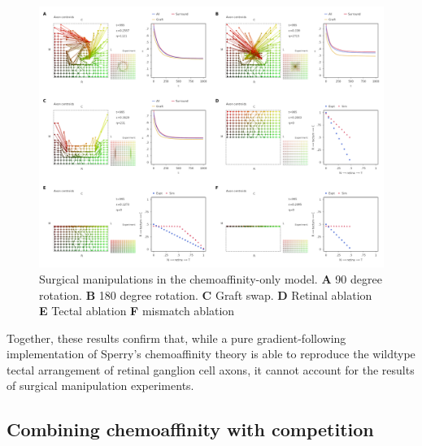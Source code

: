 \documentclass[11pt, a4paper]{article}
\begin{document}
%
%
\begin{figure}
\includegraphics[width=0.95\linewidth]{./images/fig_chemo_manipulations.png}
\caption{Surgical manipulations in the chemoaffinity-only model. \textbf{A} 90 degree
rotation. \textbf{B} 180 degree rotation. \textbf{C} Graft swap. \textbf{D}
Retinal ablation \textbf{E} Tectal ablation \textbf{F} mismatch ablation}
\label{f:chsurg}
\end{figure}

Together, these results confirm that, while a pure gradient-following
implementation of Sperry's chemoaffinity theory is able to reproduce the
wildtype tectal arrangement of retinal ganglion cell axons, it cannot account
for the results of surgical manipulation experiments.

\subsection*{Combining chemoaffinity with competition}
\end{document}
